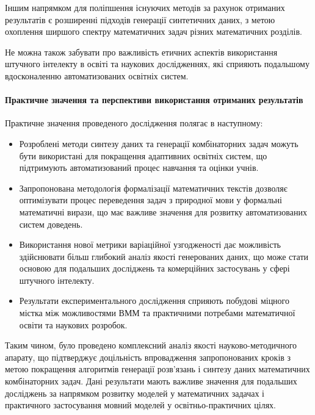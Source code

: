 Іншим напрямком для поліпшення існуючих методів за рахунок отриманих результатів є розширенні підходів генерації синтетичних даних, з метою охоплення ширшого спектру математичних задач різних математичних розділів.

Не можна також забувати про важливість етичних аспектів використання штучного інтелекту в освіті та наукових дослідженнях, які сприяють подальшому вдосконаленню автоматизованих освітніх систем.

\paragraph{Практичне значення та перспективи використання отриманих результатів}
Практичне значення проведеного дослідження полягає в наступному:
\begin{itemize}
    \item Розроблені методи синтезу даних та генерації комбінаторних задач можуть бути використані для покращення адаптивних освітніх систем, що підтримують автоматизований процес навчання та оцінки учнів.
    \item Запропонована методологія формалізації математичних текстів дозволяє оптимізувати процес переведення задач з природної мови у формальні математичні вирази, що має важливе значення для розвитку автоматизованих систем доведень.
    \item Використання нової метрики варіаційної узгодженості дає можливість здійснювати більш глибокий аналіз якості генерованих даних, що може стати основою для подальших досліджень та комерційних застосувань у сфері штучного інтелекту.
    \item Результати експериментального дослідження сприяють побудові міцного містка між можливостями ВММ та практичними потребами математичної освіти та наукових розробок.
\end{itemize}

Таким чином, було проведено комплексний аналіз якості науково-методичного апарату, що підтверджує доцільність впровадження запропонованих кроків з метою покращення алгоритмів генерації розв’язань і синтезу даних математичних комбінаторних задач. Дані результати мають важливе значення для подальших досліджень за напрямком розвитку моделей у математичних задачах і практичного застосування мовний моделей у освітньо-практичних цілях.
